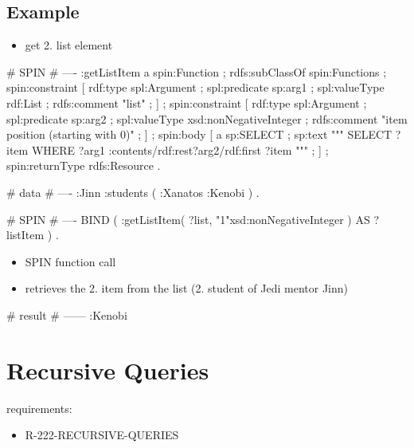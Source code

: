 \documentclass{llncs}
\begin{document}
\subsection{Example}

\begin{itemize}
	\item get 2. list element
\end{itemize}

\begin{ex}
# SPIN
# ----
:getListItem
    a spin:Function ; rdfs:subClassOf spin:Functions ;
    spin:constraint [
        rdf:type spl:Argument ;
        spl:predicate sp:arg1 ;
        spl:valueType rdf:List ;
        rdfs:comment "list" ; ] ;
    spin:constraint [
        rdf:type spl:Argument ;
        spl:predicate sp:arg2 ;
        spl:valueType xsd:nonNegativeInteger ;
        rdfs:comment "item position (starting with 0)" ; ] ;
    spin:body [
        a sp:SELECT ;
        sp:text """
            SELECT ?item
            WHERE {
                ?arg1 :contents/rdf:rest{?arg2}/rdf:first ?item } """ ; ] ;
    spin:returnType rdfs:Resource .
\end{ex}

\begin{ex}
# data
# ----
:Jinn :students 
     ( :Xanatos :Kenobi ) . 
\end{ex}

\begin{ex}
# SPIN
# ----
BIND ( :getListItem( ?list, "1"xsd:nonNegativeInteger ) AS ?listItem ) .
\end{ex}

\begin{itemize}
  \item SPIN function call
	\item retrieves the 2. item from the list (2. student of Jedi mentor Jinn)
\end{itemize}

\begin{ex}
# result
# ------
:Kenobi
\end{ex}

\section{Recursive Queries}

requirements:

\begin{itemize}
	\item R-222-RECURSIVE-QUERIES
\end{itemize}
\end{document}
